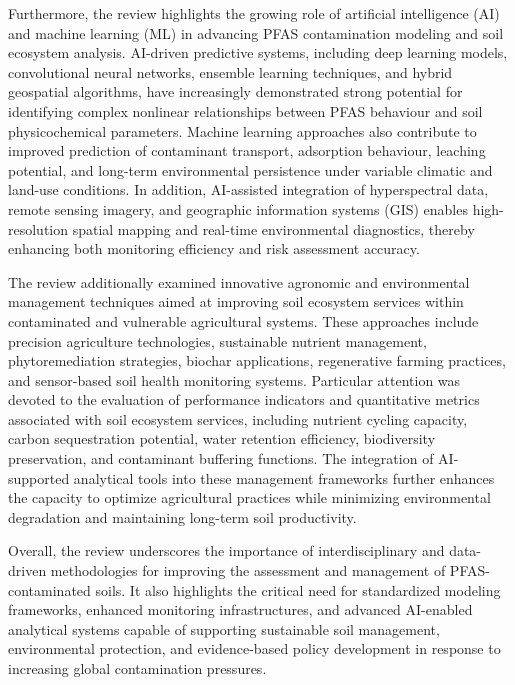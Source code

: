 \documentclass[sn-mathphys-num]{sn-jnl}
\begin{document}
Furthermore, the review highlights the growing role of artificial intelligence
(AI) and machine learning (ML) in advancing PFAS contamination modeling and
soil ecosystem analysis. AI-driven predictive systems, including deep learning
models, convolutional neural networks, ensemble learning techniques, and hybrid
geospatial algorithms, have increasingly demonstrated strong potential for
identifying complex nonlinear relationships between PFAS behaviour and soil
physicochemical parameters. Machine learning approaches also contribute to
improved prediction of contaminant transport, adsorption behaviour, leaching
potential, and long-term environmental persistence under variable climatic and
land-use conditions. In addition, AI-assisted integration of hyperspectral
data, remote sensing imagery, and geographic information systems (GIS) enables
high-resolution spatial mapping and real-time environmental diagnostics,
thereby enhancing both monitoring efficiency and risk assessment accuracy.

The review additionally examined innovative agronomic and environmental
management techniques aimed at improving soil ecosystem services within
contaminated and vulnerable agricultural systems. These approaches include
precision agriculture technologies, sustainable nutrient management,
phytoremediation strategies, biochar applications, regenerative farming
practices, and sensor-based soil health monitoring systems. Particular
attention was devoted to the evaluation of performance indicators and
quantitative metrics associated with soil ecosystem services, including
nutrient cycling capacity, carbon sequestration potential, water retention
efficiency, biodiversity preservation, and contaminant buffering functions.
The integration of AI-supported analytical tools into these management
frameworks further enhances the capacity to optimize agricultural practices
while minimizing environmental degradation and maintaining long-term soil
productivity.

Overall, the review underscores the importance of interdisciplinary and
data-driven methodologies for improving the assessment and management of
PFAS-contaminated soils. It also highlights the critical need for standardized
modeling frameworks, enhanced monitoring infrastructures, and advanced
AI-enabled analytical systems capable of supporting sustainable soil
management, environmental protection, and evidence-based policy development in
response to increasing global contamination pressures.



\end{document}
